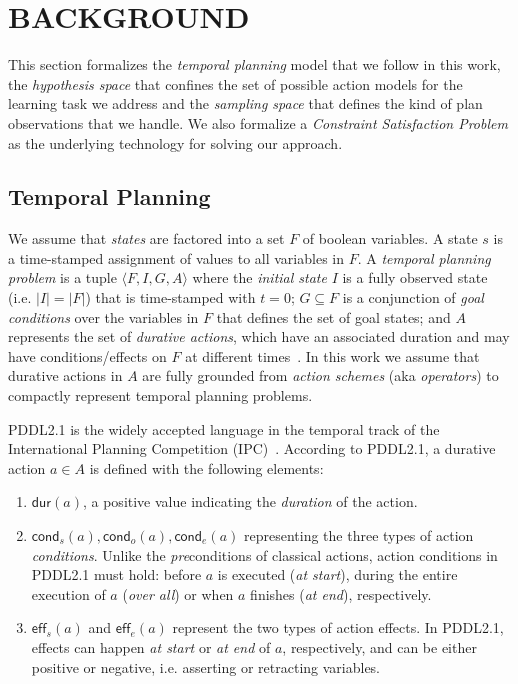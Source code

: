 \documentclass{ecai}
\newcommand{\tup}[1]{{\langle #1 \rangle}}
\newcommand{\eff}{\mathsf{eff}}    %
\newcommand{\cond}{\mathsf{cond}}  %
\newcommand{\dur}{\mathsf{dur}}    %
\begin{document}
\section{BACKGROUND}

This section formalizes the {\em temporal planning} model that we follow in this work, the {\em hypothesis space} that confines the set of possible action models for the learning task we address and the {\em sampling space} that defines the kind of plan observations that we handle. We also formalize a {\em Constraint Satisfaction Problem} as the underlying technology for solving our approach.

\subsection{Temporal Planning}
\label{sec:temporalplanning}

We assume that {\em states} are factored into a set $F$ of boolean variables. A state $s$ is a time-stamped assignment of values to all variables in $F$. 
A {\em temporal planning problem} is a tuple $\tup{F,I,G,A}$ where the {\em initial state} $I$ is a fully observed state (i.e. $|I|=|F|$) that is time-stamped with $t=0$; $G \subseteq F$ is a conjunction of {\em goal conditions} over the variables in $F$ that defines the set of goal states; and $A$ represents the set of {\em durative actions}, which have an associated duration and may have conditions/effects on $F$ at different times~\cite{garrido2009constraint,vidal2006branching}.
In this work we assume that durative actions in $A$ are fully grounded from {\em action schemes} (aka {\em operators}) to compactly represent temporal planning problems. 

PDDL2.1 is the widely accepted language in the
temporal track of the International Planning Competition (IPC)~\cite{fox2003pddl2,ghallab2004automated}. According to PDDL2.1, a durative action $a\in A$ is defined with the following elements:

\begin{enumerate}
\item $\dur(a)$, a positive value indicating the {\em duration} of the action.

\item $\cond_s(a), \cond_o(a), \cond_e(a)$ representing the three types of action {\em conditions}. Unlike the \emph{pre}conditions of classical actions, action conditions in PDDL2.1 must hold: before $a$ is executed ({\em at start}), during the entire execution of $a$ ({\em over all}) or when $a$ finishes ({\em at end}), respectively. 

\item $\eff_s(a)$ and $\eff_e(a)$ represent the two types of action effects. In PDDL2.1, effects can happen {\em at start} or {\em at end} of $a$, respectively, and can be either positive or negative, i.e. asserting or retracting variables. 

\end{enumerate}
\end{document}
